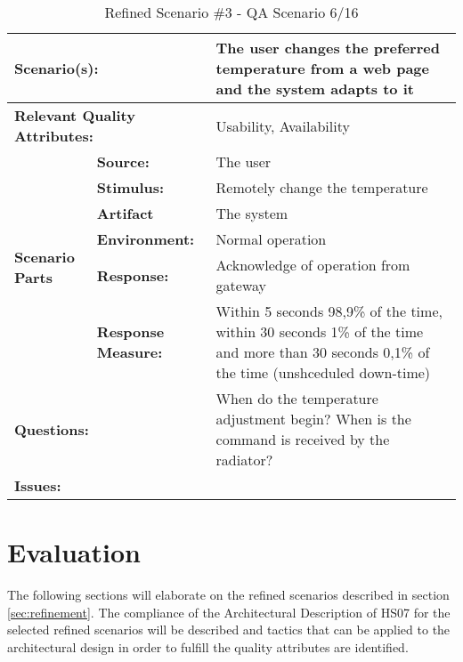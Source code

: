 \documentclass[a4paper,10pt]{article}
\begin{document}
\begin{table}[!htp]
\begin{center}
\begin{tabular}{|p{0.3cm}|p{2.5cm}|p{8cm}|}
  \hline
  \multicolumn{2}{|p{3cm}|}{\bfseries Scenario(s):} & The user changes the preferred temperature from a web page and the system adapts to it \\
  \hline
  \multicolumn{2}{|p{3cm}|}{\bfseries Relevant Quality Attributes:} & Usability,  Availability \\
  \hline
  \multirow{6}{*}{\begin{sideways}{\bfseries Scenario Parts}\end{sideways}}
  & {\bfseries Source:} & The user \\
  \cline{2-3}
  & {\bfseries Stimulus:} & Remotely change the temperature \\
  \cline{2-3}
  & {\bfseries Artifact} & The system \\
  \cline{2-3}
  & {\bfseries Environment:} & Normal operation \\
  \cline{2-3}
  & {\bfseries Response:} & Acknowledge of operation from gateway \\
  \cline{2-3}
  & {\bfseries Response \mbox{Measure:}} & Within 5 seconds 98,9\% of the time, within 30 seconds 1\% of the time and more than 30 seconds 0,1\% of the time (unshceduled down-time) \\
  \hline
  \multicolumn{2}{|p{3cm}|}{\bfseries Questions:} & When do the temperature adjustment begin? When is the command is received by the radiator? \\
  \hline
  \multicolumn{2}{|p{3cm}|}{\bfseries Issues:} &  \\
  \hline
\end{tabular}
\caption{Refined Scenario \#3 - QA Scenario 6/16}
\label{scenario3}
\end{center}
\end{table}


\section{Evaluation}

The following sections will elaborate on the refined scenarios described in section \ref{sec:refinement}.
The compliance of the Architectural Description of HS07 \cite{SAiP1H1} for the selected refined
scenarios will be described and tactics that can be applied to the architectural design in order to
fulfill the quality attributes are identified.
\end{document}
